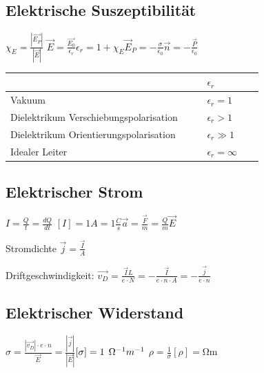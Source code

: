 \documentclass[10pt,a4paper]{scrartcl}
\begin{document}
\begin{multicols*}{3}
	\subsection{Elektrische Suszeptibilität}
	$\chi_E=\frac{|\vec{E_P}|}{|\vec{E}|}$ \hfill $\vec{E}=\frac{\vec{E_0}}{\epsilon_r}$\hfill $\epsilon_r=1+\chi_E$\hfill$\vec{E}_P=-\frac{\sigma}{\epsilon_0}\vec{n}=-\frac{\vec{P}}{\epsilon_0}$
	
	
	\begin{tabular}{p{0.7\linewidth}|p{0.2\linewidth}}
	&$\epsilon_r$\\
	\hline
	Vakuum&$\epsilon_r=1$\\
	\hline
	Dielektrikum Verschiebungspolarisation&$\epsilon_r > 1$\\
	\hline
	Dielektrikum Orientierungspolarisation&$\epsilon_r \gg 1$\\
	\hline
	Idealer Leiter&\mbox{$\epsilon_r =\infty$}\\
	\end{tabular}

	\hspace{2ex}
		
	\subsection*{Elektrischer Strom}	
	
	$I = \frac{Q}{t} = \frac{dQ}{dt}$ \hfill $[I]=1A=1\frac{C}{s}$\hfill$\vec{a}=\frac{\vec{F}}{m}=\frac{Q}{m}\vec{E}$
	
	Stromdichte $\vec{j}=\frac{\vec{I}}{A}$
	
	Driftgeschwindigkeit:\hspace{1ex} $\vec{v_D}=\frac{\vec{I}L}{e\cdot N}=-\frac{\vec{I}}{e\cdot n\cdot A}=-\frac{\vec{j}}{e\cdot n}$
	
	
	\subsection*{Elektrischer Widerstand}
	
	$\sigma = \frac{|\vec{v_D}|\cdot e\cdot n}{\vec{E}}=\frac{|\vec{j}|}{|\vec{E}|}$\hfill$[\sigma]=1\hspace{1ex}\Omega^{-1}m^{-1}$
	$\rho = \frac{1}{\sigma}$\hfill$[\rho]=\si{\ohm\meter}$


\end{multicols*}
\end{document}

